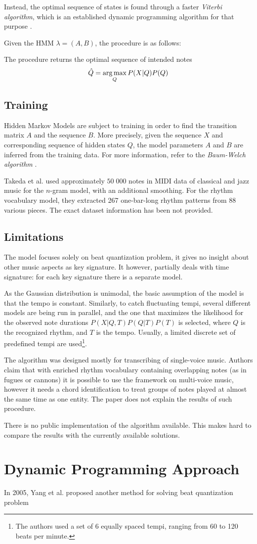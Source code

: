 Instead, the optimal sequence of states is found through a faster \emph{Viterbi algorithm}, which is an established dynamic programming algorithm for that purpose \cite[p.210--220]{Jurafsky2009}. 

Given the HMM $\lambda = (A, B)$, the procedure is as follows:



The procedure returns the optimal sequence of intended notes $$\hat{Q} = \argmax_Q P(X|Q)P(Q)$$

\subsection{Training}

Hidden Markov Models are subject to training in order to find the transition matrix $A$ and the sequence $B$. More precisely, given the sequence $X$ and corresponding sequence of hidden states $Q$, the model parameters $A$ and $B$ are inferred from the training data. For more information, refer to the \emph{Baum-Welch algorithm} \cite[p. 220--226]{Jurafsky2009}.

Takeda et al. used approximately $50\;000$ notes in MIDI data of classical and jazz music for the $n$-gram model, with an additional smoothing. For the rhythm vocabulary model, they extracted 267 one-bar-long rhythm patterns from 88 various pieces. The exact dataset information has been not provided.

\subsection{Limitations}

The model focuses solely on beat quantization problem, it gives no insight about other music aspects as key signature. It however, partially deals with time signature: for each key signature there is a separate model.

As the Gaussian distribution is unimodal, the basic assumption of the model is that the tempo is constant. Similarly, to catch fluctuating tempi, several different models are being run in parallel, and the one that maximizes the likelihood for the observed note durations $P(X|Q,T)P(Q|T)P(T)$ is selected, where $Q$ is the recognized rhythm, and $T$ is the tempo. Usually, a limited discrete set of predefined tempi are used\footnote{The authors used a set of 6 equally spaced tempi, ranging from 60 to 120 beats per minute.}.

The algorithm was designed mostly for transcribing of single-voice music. Authors claim that with enriched rhythm vocabulary containing overlapping notes (as in fugues or cannons) it is possible to use the framework on multi-voice music, however it needs a chord identification to treat groups of notes played at almost the same time as one entity. The paper does not explain the results of such procedure.

There is no public implementation of the algorithm available. This makes hard to compare the results with the currently available solutions.

\section{Dynamic Programming Approach}

In 2005, Yang et al. proposed another method for solving beat quantization problem \cite{Yang2005}